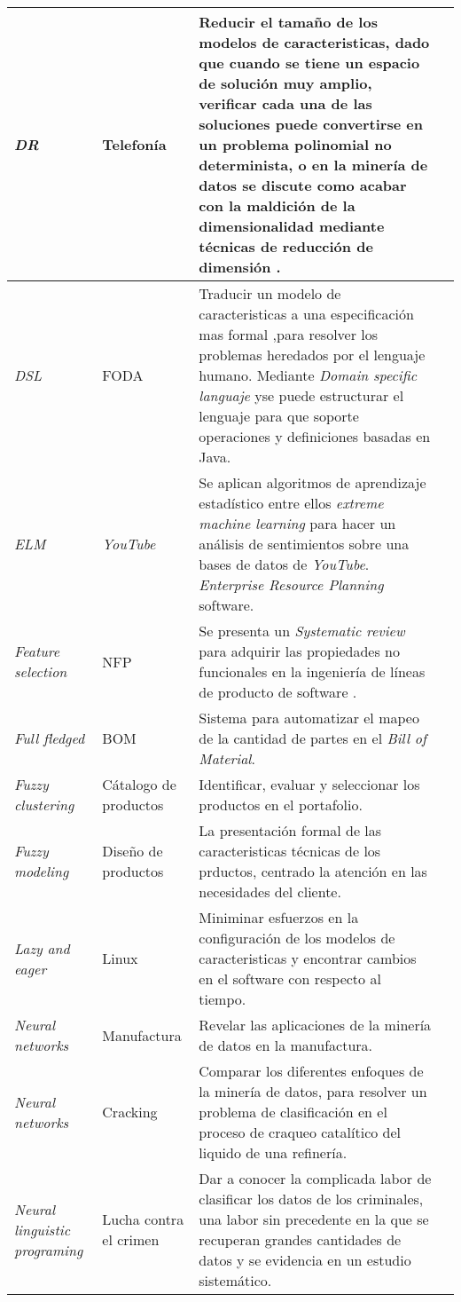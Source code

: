 \begin{longtable}{|p{3cm}|p{3cm}|p{6cm}|c|}
	\textit{DR}     & Telefonía &Reducir el tamaño de los modelos de caracteristicas, dado que cuando se tiene un espacio de solución muy amplio, verificar cada una de las soluciones puede convertirse en un problema polinomial no determinista, o en la minería de datos se discute como acabar con la maldición de la dimensionalidad mediante técnicas de reducción de dimensión .   & \cite{Niu2008}  \tabularnewline \hline
	\textit{DSL}  & FODA &Traducir un modelo de caracteristicas a una especificación mas formal ,para resolver los problemas heredados por el lenguaje humano. Mediante \textit{Domain specific languaje} yse puede estructurar el lenguaje para que soporte operaciones y definiciones basadas en Java. & \cite{Huang2013}  \tabularnewline \hline
	\textit{ELM}     & \textit{YouTube} &Se aplican algoritmos de aprendizaje estadístico entre ellos \textit{extreme machine learning} para hacer un análisis de sentimientos sobre una bases de datos de \textit{YouTube}. \textit{Enterprise Resource Planning } software.  & \cite{Sajadfar2015}  \tabularnewline \hline
	\textit{Feature selection}     & NFP               & Se presenta un \textit{Systematic review} para adquirir las propiedades no funcionales en la ingeniería de líneas de producto de software . & \cite{Kalagnanam2004} \tabularnewline \hline
	\textit{Full fledged}     & BOM & Sistema para automatizar el mapeo de la cantidad de partes en el \textit{Bill of Material}.   & \cite{Kalagnanam2004} \tabularnewline \hline
	\textit{Fuzzy clustering}     & Cátalogo de productos      & Identificar, evaluar y seleccionar los productos en el portafolio.  & \cite{Jiao2005} \tabularnewline \hline
	\textit{Fuzzy modeling}     & Diseño de productos       & La presentación formal de las caracteristicas técnicas de los prductos, centrado la atención en las necesidades del cliente.  & \cite{Davril2015b}  \tabularnewline \hline
	\textit{Lazy and eager}      & Linux             & Miniminar esfuerzos en la configuración de los modelos de caracteristicas y encontrar cambios en el software con respecto al tiempo. & \cite{Janota2013,Rothberg2016}\tabularnewline \hline
	\textit{Neural networks} & Manufactura & Revelar las aplicaciones de la minería de datos en la manufactura. & \cite{Harding2006} \tabularnewline \hline
	\textit{Neural networks} & Cracking & Comparar los diferentes enfoques de la minería de datos, para resolver un problema de clasificación en el proceso de craqueo catalítico del liquido de una refinería. & \cite{Wang1998} \tabularnewline \hline
	\textit{Neural linguistic programing} &Lucha contra el crimen& Dar a conocer la complicada labor de clasificar los datos de los criminales,  una labor sin precedente en la que se recuperan grandes cantidades de datos y se evidencia en un estudio sistemático. & \cite{EdwardsM.2015} \tabularnewline \hline

\end{longtable}
